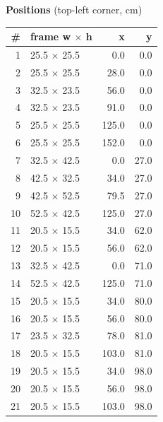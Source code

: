 \documentclass[a4paper,landscape,10pt]{article}
\begin{document}
\begin{minipage}[t]{0.25\textwidth}
\vspace{8pt}
{\bfseries Positions} (top-left corner, cm)\\[2pt]
\tiny
\begin{tabular}{@{}r l r r@{}}
\toprule
\# & frame w $\times$ h & x & y \\
\midrule
1 & 25.5 $\times$ 25.5 & 0.0 & 0.0 \\
2 & 25.5 $\times$ 25.5 & 28.0 & 0.0 \\
3 & 32.5 $\times$ 23.5 & 56.0 & 0.0 \\
4 & 32.5 $\times$ 23.5 & 91.0 & 0.0 \\
5 & 25.5 $\times$ 25.5 & 125.0 & 0.0 \\
6 & 25.5 $\times$ 25.5 & 152.0 & 0.0 \\
7 & 32.5 $\times$ 42.5 & 0.0 & 27.0 \\
8 & 42.5 $\times$ 32.5 & 34.0 & 27.0 \\
9 & 42.5 $\times$ 52.5 & 79.5 & 27.0 \\
10 & 52.5 $\times$ 42.5 & 125.0 & 27.0 \\
11 & 20.5 $\times$ 15.5 & 34.0 & 62.0 \\
12 & 20.5 $\times$ 15.5 & 56.0 & 62.0 \\
13 & 32.5 $\times$ 42.5 & 0.0 & 71.0 \\
14 & 52.5 $\times$ 42.5 & 125.0 & 71.0 \\
15 & 20.5 $\times$ 15.5 & 34.0 & 80.0 \\
16 & 20.5 $\times$ 15.5 & 56.0 & 80.0 \\
17 & 23.5 $\times$ 32.5 & 78.0 & 81.0 \\
18 & 20.5 $\times$ 15.5 & 103.0 & 81.0 \\
19 & 20.5 $\times$ 15.5 & 34.0 & 98.0 \\
20 & 20.5 $\times$ 15.5 & 56.0 & 98.0 \\
21 & 20.5 $\times$ 15.5 & 103.0 & 98.0 \\
\bottomrule
\end{tabular}
\end{minipage}
\clearpage
\end{document}
